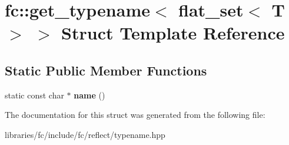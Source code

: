 \hypertarget{structfc_1_1get__typename_3_01flat__set_3_01_t_01_4_01_4}{}\section{fc\+:\+:get\+\_\+typename$<$ flat\+\_\+set$<$ T $>$ $>$ Struct Template Reference}
\label{structfc_1_1get__typename_3_01flat__set_3_01_t_01_4_01_4}
\subsection*{Static Public Member Functions}
\begin{DoxyCompactItemize}
\item 
\mbox{\label{structfc_1_1get__typename_3_01flat__set_3_01_t_01_4_01_4_afb1db2dfc344a3b11b73cf2abd47a6c3}} 
static const char $\ast$ {\bfseries name} ()
\end{DoxyCompactItemize}


The documentation for this struct was generated from the following file\+:\begin{DoxyCompactItemize}
\item 
libraries/fc/include/fc/reflect/typename.\+hpp\end{DoxyCompactItemize}
